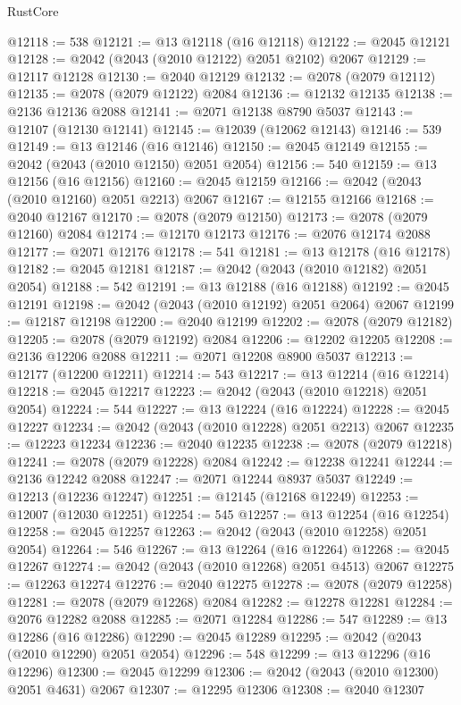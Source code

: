 \begin{lexlean}{RustCore}
\begin{coremodule}
@12118 := 538
@12121 := @13 @12118 (@16 @12118)
@12122 := @2045 @12121
@12128 := @2042 (@2043 (@2010 @12122) @2051 @2102) @2067
@12129 := @12117 @12128
@12130 := @2040 @12129
@12132 := @2078 (@2079 @12112)
@12135 := @2078 (@2079 @12122) @2084
@12136 := @12132 @12135
@12138 := @2136 @12136 @2088
@12141 := @2071 @12138 @8790 @5037
@12143 := @12107 (@12130 @12141)
@12145 := @12039 (@12062 @12143)
@12146 := 539
@12149 := @13 @12146 (@16 @12146)
@12150 := @2045 @12149
@12155 := @2042 (@2043 (@2010 @12150) @2051 @2054)
@12156 := 540
@12159 := @13 @12156 (@16 @12156)
@12160 := @2045 @12159
@12166 := @2042 (@2043 (@2010 @12160) @2051 @2213) @2067
@12167 := @12155 @12166
@12168 := @2040 @12167
@12170 := @2078 (@2079 @12150)
@12173 := @2078 (@2079 @12160) @2084
@12174 := @12170 @12173
@12176 := @2076 @12174 @2088
@12177 := @2071 @12176
@12178 := 541
@12181 := @13 @12178 (@16 @12178)
@12182 := @2045 @12181
@12187 := @2042 (@2043 (@2010 @12182) @2051 @2054)
@12188 := 542
@12191 := @13 @12188 (@16 @12188)
@12192 := @2045 @12191
@12198 := @2042 (@2043 (@2010 @12192) @2051 @2064) @2067
@12199 := @12187 @12198
@12200 := @2040 @12199
@12202 := @2078 (@2079 @12182)
@12205 := @2078 (@2079 @12192) @2084
@12206 := @12202 @12205
@12208 := @2136 @12206 @2088
@12211 := @2071 @12208 @8900 @5037
@12213 := @12177 (@12200 @12211)
@12214 := 543
@12217 := @13 @12214 (@16 @12214)
@12218 := @2045 @12217
@12223 := @2042 (@2043 (@2010 @12218) @2051 @2054)
@12224 := 544
@12227 := @13 @12224 (@16 @12224)
@12228 := @2045 @12227
@12234 := @2042 (@2043 (@2010 @12228) @2051 @2213) @2067
@12235 := @12223 @12234
@12236 := @2040 @12235
@12238 := @2078 (@2079 @12218)
@12241 := @2078 (@2079 @12228) @2084
@12242 := @12238 @12241
@12244 := @2136 @12242 @2088
@12247 := @2071 @12244 @8937 @5037
@12249 := @12213 (@12236 @12247)
@12251 := @12145 (@12168 @12249)
@12253 := @12007 (@12030 @12251)
@12254 := 545
@12257 := @13 @12254 (@16 @12254)
@12258 := @2045 @12257
@12263 := @2042 (@2043 (@2010 @12258) @2051 @2054)
@12264 := 546
@12267 := @13 @12264 (@16 @12264)
@12268 := @2045 @12267
@12274 := @2042 (@2043 (@2010 @12268) @2051 @4513) @2067
@12275 := @12263 @12274
@12276 := @2040 @12275
@12278 := @2078 (@2079 @12258)
@12281 := @2078 (@2079 @12268) @2084
@12282 := @12278 @12281
@12284 := @2076 @12282 @2088
@12285 := @2071 @12284
@12286 := 547
@12289 := @13 @12286 (@16 @12286)
@12290 := @2045 @12289
@12295 := @2042 (@2043 (@2010 @12290) @2051 @2054)
@12296 := 548
@12299 := @13 @12296 (@16 @12296)
@12300 := @2045 @12299
@12306 := @2042 (@2043 (@2010 @12300) @2051 @4631) @2067
@12307 := @12295 @12306
@12308 := @2040 @12307

\end{coremodule}
\end{lexlean}
